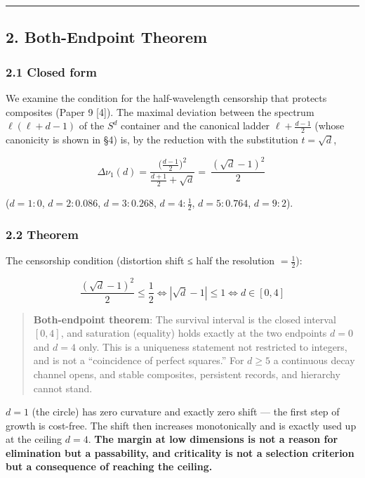 \documentclass[
]{ltjsarticle}
\begin{document}
\begin{center}\rule{0.5\linewidth}{0.5pt}\end{center}

\subsection{2. Both-Endpoint Theorem}\label{both-endpoint-theorem}

\subsubsection{2.1 Closed form}\label{closed-form}

We examine the condition for the half-wavelength censorship that
protects composites (Paper 9 {[}4{]}). The maximal deviation between the
spectrum \(\ell(\ell+d-1)\) of the \(S^d\) container and the canonical
ladder \(\ell+\tfrac{d-1}2\) (whose canonicity is shown in §4) is, by
the reduction with the substitution \(t=\sqrt d\),

\[
\Delta\nu_1(d)=\frac{\bigl(\tfrac{d-1}2\bigr)^2}{\tfrac{d+1}2+\sqrt d}=\boxed{\ \frac{(\sqrt d-1)^2}{2}\ }
\]

(\(d=1:0\), \(d=2:0.086\), \(d=3:0.268\), \(d=4:\tfrac12\),
\(d=5:0.764\), \(d=9:2\)).

\subsubsection{2.2 Theorem}\label{theorem}

The censorship condition (distortion shift ≤ half the resolution
\(=\tfrac12\)):

\[
\frac{(\sqrt d-1)^2}{2}\le\frac12\iff|\sqrt d-1|\le1\iff d\in[0,4]
\]

\begin{quote}
\textbf{Both-endpoint theorem}: The survival interval is the closed
interval \([0,4]\), and saturation (equality) holds exactly at the two
endpoints \(d=0\) and \(d=4\) only. This is a uniqueness statement not
restricted to integers, and is not a ``coincidence of perfect squares.''
For \(d\ge5\) a continuous decay channel opens, and stable composites,
persistent records, and hierarchy cannot stand.
\end{quote}

\(d=1\) (the circle) has zero curvature and exactly zero shift --- the
first step of growth is cost-free. The shift then increases
monotonically and is exactly used up at the ceiling \(d=4\). \textbf{The
margin at low dimensions is not a reason for elimination but a
passability, and criticality is not a selection criterion but a
consequence of reaching the ceiling.}
\end{document}
